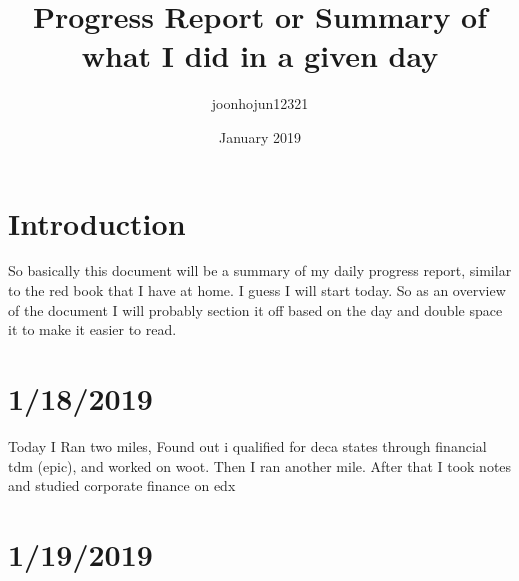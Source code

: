 \documentclass{article}
\title{Progress Report or Summary of what I did in a given  day}
\author{joonhojun12321 }
\date{January 2019}
\begin{document}
\maketitle

\section{Introduction}
So basically this document will be a summary of my daily progress report, similar to the red book that I have at home. I guess I will start today. 
So as an overview of the document I will probably section it off based on the day and double space it to make it easier to read.
\section{1/18/2019}
Today I Ran two miles, Found out i qualified for deca states through financial tdm (epic), and worked on woot. Then I ran another mile. After that I took notes and studied corporate finance on edx
\section{1/19/2019}
\end{document}
